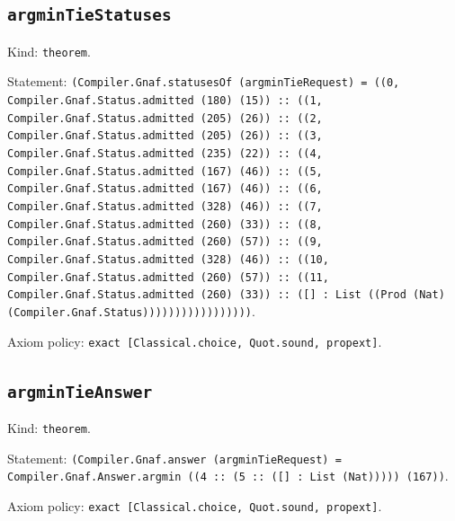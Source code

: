 \documentclass[11pt]{article}
\begin{document}
\subsection*{\texttt{argminTieStatuses}}
\noindent Kind: \texttt{theorem}.\par
\noindent Statement: \texttt{(Compiler.Gnaf.statusesOf (argminTieRequest) = ((0, Compiler.Gnaf.Status.admitted (180) (15)) :: ((1, Compiler.Gnaf.Status.admitted (205) (26)) :: ((2, Compiler.Gnaf.Status.admitted (205) (26)) :: ((3, Compiler.Gnaf.Status.admitted (235) (22)) :: ((4, Compiler.Gnaf.Status.admitted (167) (46)) :: ((5, Compiler.Gnaf.Status.admitted (167) (46)) :: ((6, Compiler.Gnaf.Status.admitted (328) (46)) :: ((7, Compiler.Gnaf.Status.admitted (260) (33)) :: ((8, Compiler.Gnaf.Status.admitted (260) (57)) :: ((9, Compiler.Gnaf.Status.admitted (328) (46)) :: ((10, Compiler.Gnaf.Status.admitted (260) (57)) :: ((11, Compiler.Gnaf.Status.admitted (260) (33)) :: ([] : List ((Prod (Nat) (Compiler.Gnaf.Status)))))))))))))))))}.\par
\noindent Axiom policy: \texttt{exact [Classical.choice, Quot.sound, propext]}.\par
\subsection*{\texttt{argminTieAnswer}}
\noindent Kind: \texttt{theorem}.\par
\noindent Statement: \texttt{(Compiler.Gnaf.answer (argminTieRequest) = Compiler.Gnaf.Answer.argmin ((4 :: (5 :: ([] : List (Nat))))) (167))}.\par
\noindent Axiom policy: \texttt{exact [Classical.choice, Quot.sound, propext]}.\par
\end{document}
